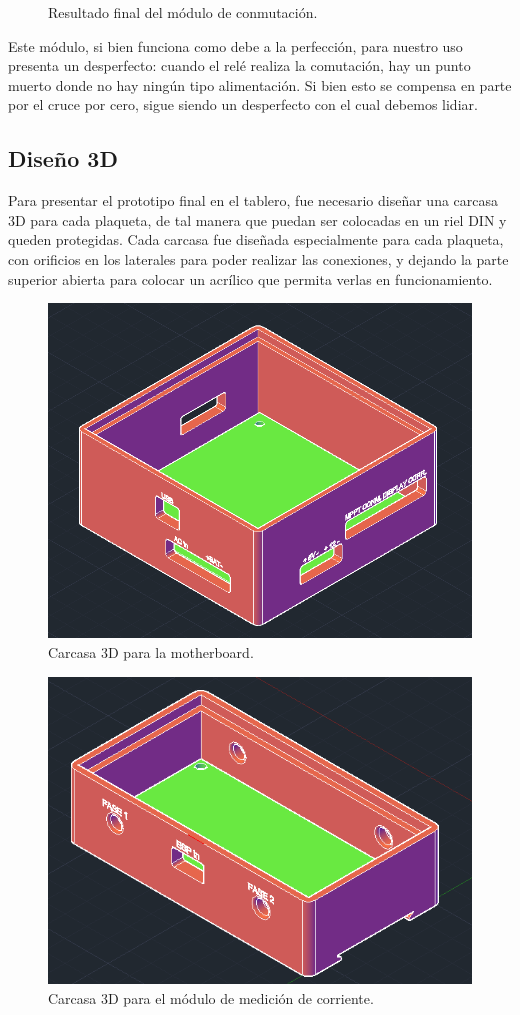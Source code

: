 \begin{figure}[H]
\caption{Resultado final del módulo de conmutación.}
\label{fig:image2}
\end{figure}

Este módulo, si bien funciona como debe a la perfección, para nuestro uso presenta un desperfecto: cuando el relé realiza la comutación, hay un punto muerto donde no hay ningún tipo alimentación. Si bien esto se compensa en parte por el cruce por cero, sigue siendo un desperfecto con el cual debemos lidiar.

\subsection{Diseño 3D}
Para presentar el prototipo final en el tablero, fue necesario diseñar una carcasa 3D para cada plaqueta, de tal manera que puedan ser colocadas en un riel DIN y queden protegidas. Cada carcasa fue diseñada especialmente para cada plaqueta, con orificios en los laterales para poder realizar las conexiones, y dejando la parte superior abierta para colocar un acrílico que permita verlas en funcionamiento.\\

\begin{figure}[H]
    \centering
    \includegraphics[width=0.75\linewidth]{hardware/Screenshot_22.png}
    \caption{Carcasa 3D para la motherboard.}
    \label{fig:mother-3d}
\end{figure}

\begin{figure}[H]
    \centering
    \includegraphics[width=0.75\linewidth]{hardware/Screenshot_21.png}
    \caption{Carcasa 3D para el módulo de medición de corriente.}
    \label{corriente-3d}
\end{figure}

